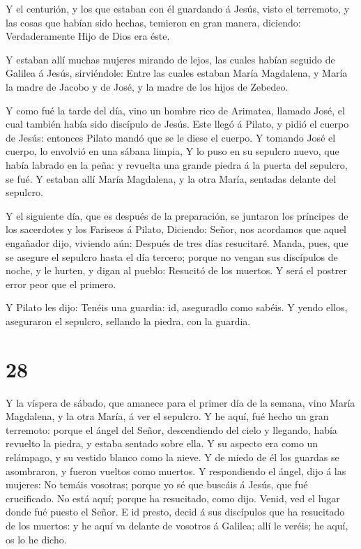  Y el centurión, y los que estaban con él guardando á
Jesús, visto el terremoto, y las cosas que habían sido hechas, temieron
en gran manera, diciendo: Verdaderamente Hijo de Dios era éste.

 Y estaban allí muchas mujeres mirando de lejos, las cuales
habían seguido de Galilea á Jesús, sirviéndole:  Entre las
cuales estaban María Magdalena, y María la madre de Jacobo y de José, y
la madre de los hijos de Zebedeo.

 Y como fué la tarde del día, vino un hombre rico de
Arimatea, llamado José, el cual también había sido discípulo de Jesús.
 Este llegó á Pilato, y pidió el cuerpo de Jesús: entonces
Pilato mandó que se le diese el cuerpo.  Y tomando José el
cuerpo, lo envolvió en una sábana limpia,  Y lo puso en su
sepulcro nuevo, que había labrado en la peña: y revuelta una grande
piedra á la puerta del sepulcro, se fué.  Y estaban allí
María Magdalena, y la otra María, sentadas delante del sepulcro.

 Y el siguiente día, que es después de la preparación, se
juntaron los príncipes de los sacerdotes y los Fariseos á Pilato,
 Diciendo: Señor, nos acordamos que aquel engañador dijo,
viviendo aún: Después de tres días resucitaré.  Manda,
pues, que se asegure el sepulcro hasta el día tercero; porque no vengan
sus discípulos de noche, y le hurten, y digan al pueblo: Resucitó de los
muertos. Y será el postrer error peor que el primero.

 Y Pilato les dijo: Tenéis una guardia: id, aseguradlo como
sabéis.  Y yendo ellos, aseguraron el sepulcro, sellando la
piedra, con la guardia.

\hypertarget{section-27}{%
\section{28}\label{section-27}}

 Y la víspera de sábado, que amanece para el primer día de
la semana, vino María Magdalena, y la otra María, á ver el sepulcro.
 Y he aquí, fué hecho un gran terremoto: porque el ángel del
Señor, descendiendo del cielo y llegando, había revuelto la piedra, y
estaba sentado sobre ella.  Y su aspecto era como un
relámpago, y su vestido blanco como la nieve.  Y de miedo de
él los guardas se asombraron, y fueron vueltos como muertos.
 Y respondiendo el ángel, dijo á las mujeres: No temáis
vosotras; porque yo sé que buscáis á Jesús, que fué crucificado.
 No está aquí; porque ha resucitado, como dijo. Venid, ved
el lugar donde fué puesto el Señor.  E id presto, decid á
sus discípulos que ha resucitado de los muertos: y he aquí va delante de
vosotros á Galilea; allí le veréis; he aquí, os lo he dicho.

